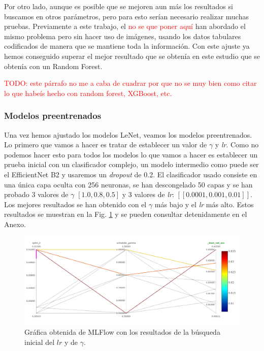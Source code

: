 \documentclass[a4paper,12pt,twoside,titlepage]{article}
\newcommand{\red}[1]{\textcolor{red}{#1}}
\begin{document}
Por otro lado, aunque es posible que se mejoren aun más los resultados si buscamos en otros parámetros, pero para esto serían necesario realizar muchas pruebas. Previamente a este trabajo, el \red{no se que poner aquí} han abordado el mismo problema pero sin hacer uso de imágenes, usando los datos tabulares codificados de manera que se mantiene toda la información. Con este ajuste ya hemos conseguido superar el mejor resultado que se obtenía en este estudio que se obtenía con un Random Forest.

\red{TODO: este párrafo no me a caba de cuadrar por que no se muy bien como citar lo que habeís hecho con random forest, XGBoost, etc.}

\subsubsection*{Modelos preentrenados}

Una vez hemos ajustado los modelos LeNet, veamos los modelos preentrenados. Lo primero que vamos a hacer es tratar de establecer un valor de $\gamma$ y \textit{lr}. Como no podemos hacer esto para todos los modelos lo que vamos a hacer es establecer un prueba inicial con un clasificador complejo, un modelo intermedio como puede ser el EfficientNet B2 y usaremos un \textit{dropout} de 0.2. El clasificador usado consiste en una única capa oculta con 256 neuronas, se han descongelado 50 capas y se han probado 3 valores de $\gamma$ $\left[1.0, 0.8, 0.5\right]$ y 3 valores de \textit{lr}: $\left[[0.0001, 0.001, 0.01]\right]$. Los mejores resultados se han obtenido con el $\gamma$ más bajo y el \textit{lr} más alto. Estos resultados se muestran en la Fig. \ref{fig:studio_optim} y se pueden consultar detenidamente en el Anexo.

\begin{figure}[h!]
  \centering
  \includegraphics[scale=0.65, center]{studio_optim_pre.png}
  \caption{Gráfica obtenida de MLFlow con los resultados de la búsqueda inicial del $lr$ y de $\gamma$.}
  \label{fig:studio_optim}
\end{figure}
\end{document}
